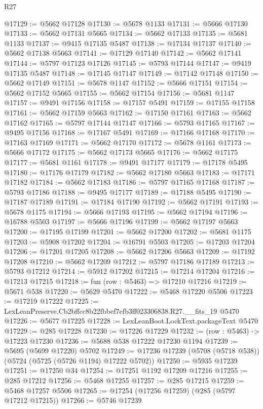 \begin{lexlean}{R27}
\begin{coremodule}
@17129 := @5662 @17128
@17130 := @5678 @1133
@17131 := @5666 @17130
@17133 := @5662 @17131 @5665
@17134 := @5662 @17133
@17135 := @5681 @1133
@17137 := @9415 @17135 @5487
@17138 := @17134 @17137
@17140 := @5662 @17138 @5663
@17141 := @17129 @17140
@17142 := @5662 @17141
@17144 := @5797 @17123 @17126
@17145 := @5793 @17144
@17147 := @9419 @17135 @5487
@17148 := @17145 @17147
@17149 := @17142 @17148
@17150 := @5662 @17149
@17151 := @5678 @1147
@17152 := @5666 @17151
@17154 := @5662 @17152 @5665
@17155 := @5662 @17154
@17156 := @5681 @1147
@17157 := @9491 @17156
@17158 := @17157 @5491
@17159 := @17155 @17158
@17161 := @5662 @17159 @5663
@17162 := @17150 @17161
@17163 := @5662 @17162
@17165 := @5797 @17144 @17147
@17166 := @5793 @17165
@17167 := @9495 @17156
@17168 := @17167 @5491
@17169 := @17166 @17168
@17170 := @17163 @17169
@17171 := @5662 @17170
@17172 := @5678 @1161
@17173 := @5666 @17172
@17175 := @5662 @17173 @5665
@17176 := @5662 @17175
@17177 := @5681 @1161
@17178 := @9491 @17177
@17179 := @17178 @5495
@17180 := @17176 @17179
@17182 := @5662 @17180 @5663
@17183 := @17171 @17182
@17184 := @5662 @17183
@17186 := @5797 @17165 @17168
@17187 := @5793 @17186
@17188 := @9495 @17177
@17189 := @17188 @5495
@17190 := @17187 @17189
@17191 := @17184 @17190
@17192 := @5662 @17191
@17193 := @5678 @1175
@17194 := @5666 @17193
@17195 := @5662 @17194
@17196 := @16788 @5503
@17197 := @5666 @17196
@17199 := @5662 @17197 @5663
@17200 := @17195 @17199
@17201 := @5662 @17200
@17202 := @5681 @1175
@17203 := @5908 @17202
@17204 := @16791 @5503
@17205 := @17203 @17204
@17206 := @17201 @17205
@17208 := @5662 @17206 @5663
@17209 := @17192 @17208
@17210 := @5662 @17209
@17212 := @5797 @17186 @17189
@17213 := @5793 @17212
@17214 := @5912 @17202
@17215 := @17214 @17204
@17216 := @17213 @17215
@17218 := fun (row : @5463) => @17210 @17216
@17219 := @5671 @538
@17220 := @5629 @5470
@17222 := @5468 @17220 @5506
@17223 := @17219 @17222
@17225 := LexLeanPreserve.Cb2bffcc8b22fbbef7efb3ff023306838.R27.__fits_19 @5470
@17226 := @5677 @17225
@17228 := LexLeanBoot.LockText.packageText @5470
@17229 := @285 @17228
@17230 := @17226 @17229
@17232 := (row : @5463) -> @17223 @17230
@17236 := @5688 @538 @17222 @17230 @1194
@17239 := @5695 (@5699 @17220) @5702
@17249 := @17236 @17239 (@5708 (@5718 @538)) (@5724 (@5725 (@5726 @1194) @17222 @5702))
@17250 := @5935 @17239
@17251 := @17250 @34
@17254 := @17251 @1192 @17209 @17216
@17255 := @285 @17212
@17256 := @5468 @17255
@17257 := @285 @17215
@17259 := @5468 @17257 @5506
@17265 := @17254 (@17256 @17259) (@285 (@5797 @17212 @17215))
@17266 := @5746 @17239

\end{coremodule}
\end{lexlean}
